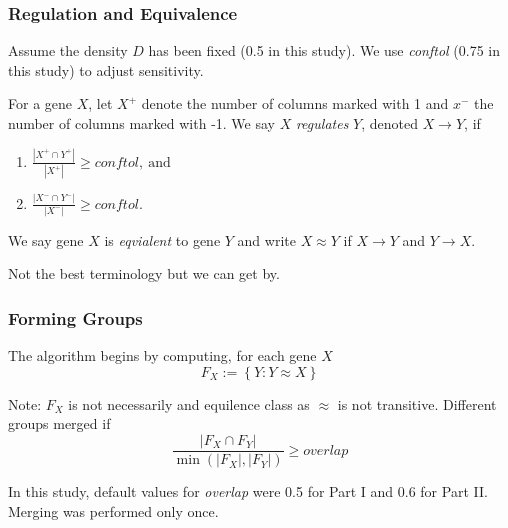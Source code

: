 \documentclass[
	11pt, %
]{beamer}
\begin{document}
\begin{frame}
	\frametitle{Regulation and Equivalence}
    
    Assume the density $D$ has been fixed (0.5 in this study). We use \emph{conftol} (0.75 in this study) to adjust sensitivity.
    
    \bigskip

    \begin{definition}
        For a gene $X$, let $X^{+}$ denote the number of columns marked with 1 and $x^{-}$ the number of columns marked with -1. We say $X$ \emph{regulates} $Y$, denoted $X \rightarrow Y$, if
        \begin{enumerate}
            \item $\frac{\left| X^{+} \cap Y^{+} \right|}{\left| X^{+} \right|} \geq conftol,\ \mathrm{and}$
            \item $\frac{\left| X^{-} \cap Y^{-} \right|}{\left| X^{-} \right|} \geq conftol.$
        \end{enumerate}
    \end{definition}

    \begin{definition}
        We say gene $X$ is \emph{eqvialent} to gene $Y$ and write $X \approx Y$ if $X \rightarrow Y$ and $Y \rightarrow X$.
    \end{definition}

    Not the best terminology but we can get by.
\end{frame}

\begin{frame}
	\frametitle{Forming Groups}

    The algorithm begins by computing, for each gene $X$
    \begin{equation*}
        F_X := \left\{ Y : Y \approx X \right\}
    \end{equation*}

    \bigskip

    Note: $F_X$ is not necessarily and equilence class as $\approx$ is not transitive. Different groups merged if
    \begin{equation*}
        \frac{\left| F_X \cap F_Y \right|}{\min(\left| F_X \right|, \left| F_Y \right|)} \geq overlap
    \end{equation*}

    In this study, default values for \emph{overlap} were 0.5 for Part I and 0.6 for Part II. Merging was performed only once.
\end{frame}
\end{document}
